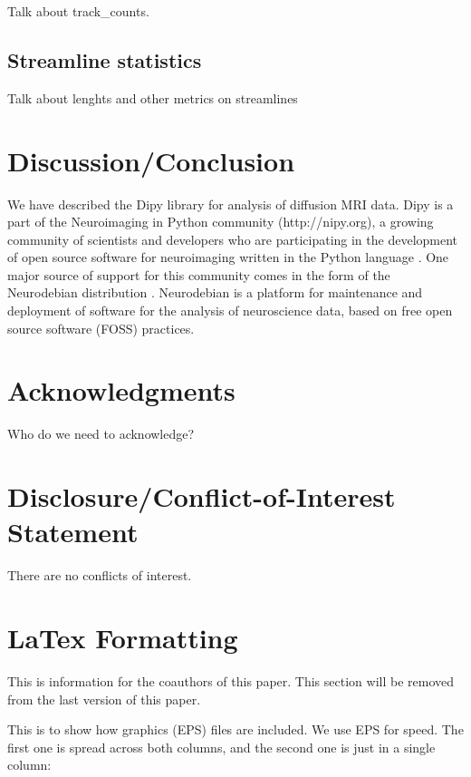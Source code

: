 \documentclass{bioinfo}
\begin{document}
Talk about track\_counts.

\subsection{Streamline statistics}

Talk about lenghts and other metrics on streamlines

\section{Discussion/Conclusion}

We have described the Dipy library for analysis of diffusion MRI data. Dipy is a part of the Neuroimaging in Python community (http://nipy.org), a growing community of scientists and developers who are participating in the development of open source software for neuroimaging written in the Python language  . One major source of support for this community comes in the form of the Neurodebian distribution \citep{Halchenko2012}. Neurodebian is a platform for maintenance and deployment of software for the analysis of neuroscience data, based on free open source software (FOSS) practices. 

\section*{Acknowledgments}
Who do we need to acknowledge?

\section*{Disclosure/Conflict-of-Interest Statement}
There are no conflicts of interest.

\section{LaTex Formatting}

This is information for the coauthors of this paper. This section will be removed from the last version of this paper.

This is to show how graphics (EPS) files are included. We use EPS for
speed. The first one is spread across both columns, and the second one
is just in a single column:
\end{document}
